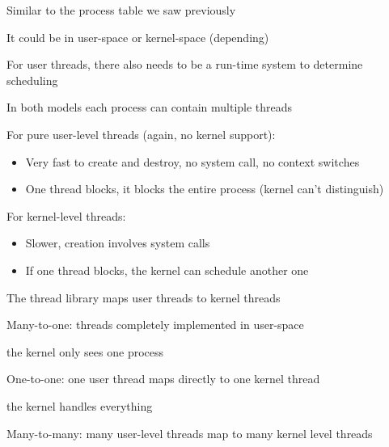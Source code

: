   \begin{slide}

    Similar to the process table we saw previously
    
    \leftspace{}It could be in user-space or kernel-space (depending)
    \medskip

    For user threads, there also needs to be a run-time system to determine
    scheduling
    \medskip

    In both models each process can contain multiple threads

  \end{slide}

  \begin{slide}


    For pure user-level threads (again, no kernel support):

    \begin{itemize}
      \item Very fast to create and destroy, no system call, no context switches
      \item One thread blocks, it blocks the entire process (kernel can't distinguish)
    \end{itemize}
    \medskip

    For kernel-level threads:

    \begin{itemize}
      \item Slower, creation involves system calls
      \item If one thread blocks, the kernel can schedule another one
    \end{itemize}

  \end{slide}

  \begin{slide}


    The thread library maps user threads to kernel threads
    \medskip

    Many-to-one: threads completely implemented in user-space

    \leftspace{}the kernel only sees one process
    \medskip

    One-to-one: one user thread maps directly to one kernel thread

    \leftspace{}the kernel handles everything
    \medskip

    Many-to-many: many user-level threads map to many kernel level threads

  \end{slide}

